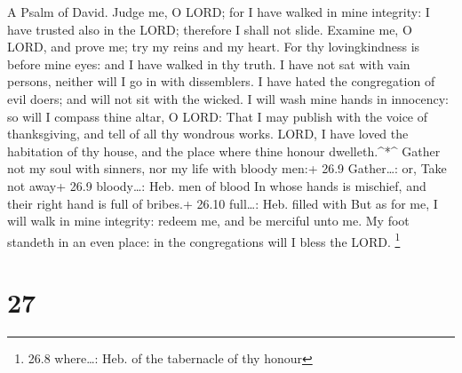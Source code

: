 A Psalm of David.  Judge me, O LORD; for I have walked in
mine integrity: I have trusted also in the LORD; therefore I shall not
slide.  Examine me, O LORD, and prove me; try my reins and
my heart.  For thy lovingkindness is before mine eyes: and I
have walked in thy truth.  I have not sat with vain persons,
neither will I go in with dissemblers.  I have hated the
congregation of evil doers; and will not sit with the wicked.
 I will wash mine hands in innocency: so will I compass
thine altar, O LORD:  That I may publish with the voice of
thanksgiving, and tell of all thy wondrous works.  LORD, I
have loved the habitation of thy house, and the place where thine honour
dwelleth.\^{}*\^{}  Gather not my soul with sinners, nor my
life with bloody men:+ 26.9 Gather\ldots: or, Take not away+ 26.9
bloody\ldots: Heb. men of blood  In whose hands is
mischief, and their right hand is full of bribes.+ 26.10 full\ldots:
Heb. filled with  But as for me, I will walk in mine
integrity: redeem me, and be merciful unto me.  My foot
standeth in an even place: in the congregations will I bless the LORD.
\footnote{26.8 where\ldots: Heb. of the tabernacle of thy honour}

\hypertarget{section-26}{%
\section{27}\label{section-26}}

